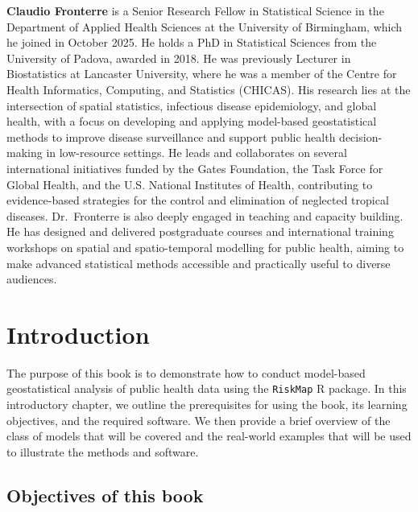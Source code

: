 \documentclass[
  letterpaper,
]{krantz}
\begin{document}
\textbf{Claudio Fronterre} is a Senior Research Fellow in Statistical
Science in the Department of Applied Health Sciences at the University
of Birmingham, which he joined in October 2025. He holds a PhD in
Statistical Sciences from the University of Padova, awarded in 2018. He
was previously Lecturer in Biostatistics at Lancaster University, where
he was a member of the Centre for Health Informatics, Computing, and
Statistics (CHICAS). His research lies at the intersection of spatial
statistics, infectious disease epidemiology, and global health, with a
focus on developing and applying model-based geostatistical methods to
improve disease surveillance and support public health decision-making
in low-resource settings. He leads and collaborates on several
international initiatives funded by the Gates Foundation, the Task Force
for Global Health, and the U.S. National Institutes of Health,
contributing to evidence-based strategies for the control and
elimination of neglected tropical diseases. Dr.~Fronterre is also deeply
engaged in teaching and capacity building. He has designed and delivered
postgraduate courses and international training workshops on spatial and
spatio-temporal modelling for public health, aiming to make advanced
statistical methods accessible and practically useful to diverse
audiences.

\newpage



\chapter{Introduction}\label{introduction}

The purpose of this book is to demonstrate how to conduct model-based
geostatistical analysis of public health data using the \texttt{RiskMap}
R package. In this introductory chapter, we outline the prerequisites
for using the book, its learning objectives, and the required software.
We then provide a brief overview of the class of models that will be
covered and the real-world examples that will be used to illustrate the
methods and software.

\section{Objectives of this book}\label{objectives-of-this-book}
\end{document}
